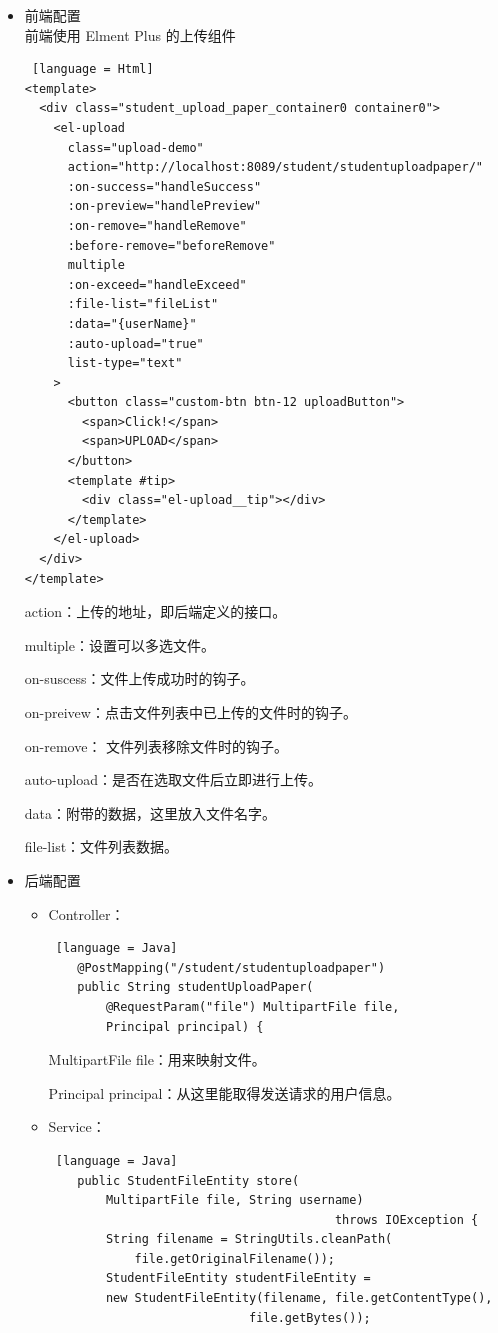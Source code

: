 \begin{itemize}
  \item 前端配置\\
        前端使用 Elment Plus 的上传组件
        \begin{lstlisting} [language = Html]
<template>
  <div class="student_upload_paper_container0 container0">
    <el-upload
      class="upload-demo"
      action="http://localhost:8089/student/studentuploadpaper/"
      :on-success="handleSuccess"
      :on-preview="handlePreview"
      :on-remove="handleRemove"
      :before-remove="beforeRemove"
      multiple
      :on-exceed="handleExceed"
      :file-list="fileList"
      :data="{userName}"
      :auto-upload="true"
      list-type="text"
    >
      <button class="custom-btn btn-12 uploadButton">
        <span>Click!</span>
        <span>UPLOAD</span>
      </button>
      <template #tip>
        <div class="el-upload__tip"></div>
      </template>
    </el-upload>
  </div>
</template>
    \end{lstlisting}
        action：上传的地址，即后端定义的接口。

        multiple：设置可以多选文件。

        on-suscess：文件上传成功时的钩子。

        on-preivew：点击文件列表中已上传的文件时的钩子。

        on-remove：	文件列表移除文件时的钩子。

        auto-upload：是否在选取文件后立即进行上传。

        data：附带的数据，这里放入文件名字。

        file-list：文件列表数据。

  \item 后端配置
        \begin{itemize}
          \item Controller：
                \begin{lstlisting} [language = Java]
    @PostMapping("/student/studentuploadpaper")
    public String studentUploadPaper(
        @RequestParam("file") MultipartFile file, 
        Principal principal) {
        \end{lstlisting}
                MultipartFile file：用来映射文件。

                Principal principal：从这里能取得发送请求的用户信息。
          \item Service：
                \begin{lstlisting} [language = Java]
    public StudentFileEntity store(
        MultipartFile file, String username) 
                                        throws IOException {
        String filename = StringUtils.cleanPath(
            file.getOriginalFilename());
        StudentFileEntity studentFileEntity = 
        new StudentFileEntity(filename, file.getContentType(), 
                            file.getBytes());


\end{lstlisting}
\end{itemize}
\end{itemize}
